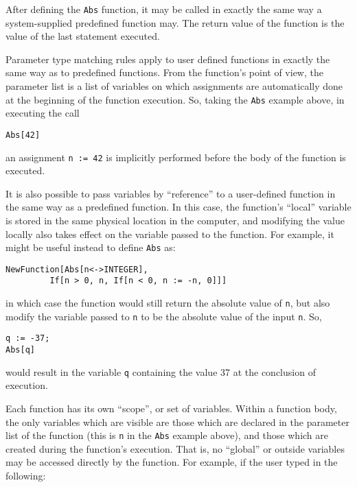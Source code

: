 \noindent After defining the \verb+Abs+ function, it may be called in exactly
the same way a system-supplied predefined function may.  The return value
of the function is the value of the last statement executed. 

Parameter type matching rules apply to user defined functions in exactly the
same way as to predefined functions.  From the function's point of view,
the parameter list is a list of variables on which assignments are
automatically done at the beginning of the function execution.  So, taking
the \verb+Abs+ example above, in executing the call

\begin{verbatim}
Abs[42]
\end{verbatim}

\noindent an assignment \verb+n := 42+ is implicitly performed before the
body of the function is executed.

It is also possible to pass variables by ``reference'' to a user-defined
function in the same way as a predefined function.  In this case, the
function's ``local'' variable is stored in the same physical location in the
computer, and modifying the value locally also takes effect on the variable
passed to the function.  For example, it might
be useful instead to define \verb+Abs+ as:

\begin{verbatim}
NewFunction[Abs[n<->INTEGER],
		 If[n > 0, n, If[n < 0, n := -n, 0]]]
\end{verbatim}

\noindent in which case the function would still return the absolute value
of \verb+n+, but also modify the variable passed to \verb+n+ to be the
absolute value of the input \verb+n+.  So,

\begin{verbatim}
q := -37;
Abs[q]
\end{verbatim}

\noindent would result in the variable \verb+q+ containing the value 37
at the conclusion of execution.

Each function has its own ``scope'', or set of variables.  Within a function
body, the only variables which are visible are those which are declared
in the parameter list of the function (this is \verb+n+ in the \verb+Abs+
example above), and those which are created during the function's execution.
That is, no ``global'' or outside variables may be accessed directly by the
function.  For example, if the user typed in the following:


